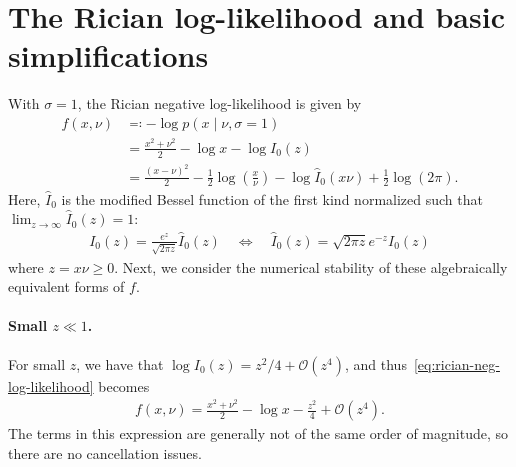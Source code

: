 \documentclass{article}
\begin{document}
\section{The Rician log-likelihood and basic simplifications}

With $\sigma=1$, the Rician negative log-likelihood is given by
%
\begin{align}
  f(x, \nu) & \eqqcolon -\log p(x \mid \nu, \sigma=1)                                                                                                                        \\
            & = \frac{x^2 + \nu^2}{2} - \log x - \log I_0(z) \label{eq:rician-neg-log-likelihood}                                                                            \\
            & = \frac{(x-\nu)^2}{2} - \frac{1}{2}\log\left(\frac{x}{\nu}\right) - \log \hat{I}_0(x \nu) + \frac{1}{2}\log(2\pi). \label{eq:rician-neg-log-likelihood-scaled}
\end{align}
%
Here, $\hat{I}_0$ is the modified Bessel function of the first kind normalized such that $\lim_{z\to\infty} \hat{I}_0(z) = 1$:
%
\begin{align}
  I_0(z) = \frac{e^z}{\sqrt{2\pi z}} \hat{I}_0(z) \quad \Leftrightarrow \quad \hat{I}_0(z) = \sqrt{2\pi z} e^{-z} I_0(z)
\end{align}
%
where $z = x\nu \ge 0$.
Next, we consider the numerical stability of these algebraically equivalent forms of $f$.

\paragraph{Small $z \ll 1$.}

For small $z$, we have that $\log I_0(z) = z^2/4 + \mathcal{O}(z^4)$, and thus~\eqref{eq:rician-neg-log-likelihood} becomes
%
\begin{align}
  f(x, \nu) = \frac{x^2 + \nu^2}{2} - \log x - \frac{z^2}{4} + \mathcal{O}(z^4).
\end{align}
%
The terms in this expression are generally not of the same order of magnitude, so there are no cancellation issues.
\end{document}
